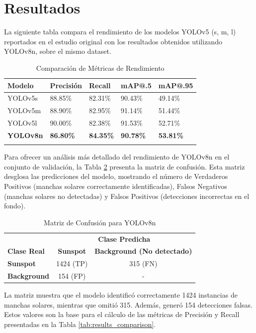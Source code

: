 \documentclass[journal]{IEEEtran}
\begin{document}
\section{Resultados}
La siguiente tabla compara el rendimiento de los modelos YOLOv5 (s, m, l) reportados en el estudio original \cite{Santos2023} con los resultados obtenidos utilizando YOLOv8n, sobre el mismo dataset.
\begin{table}[htbp]
\centering
\caption{Comparación de Métricas de Rendimiento}
\label{tab:results_comparison}
\begin{tabular}{@{}lllll@{}}
\toprule
\textbf{Modelo} & \textbf{Precisión} & \textbf{Recall} & \textbf{mAP@.5} & \textbf{mAP@.95} \\
\midrule
YOLOv5s & 88.85\% & 82.31\% & 90.43\% & 49.14\% \\
YOLOv5m & 88.90\% & 82.95\% & 91.14\% & 51.44\% \\
YOLOv5l & 90.00\% & 82.38\% & 91.53\% & 52.71\% \\
\textbf{YOLOv8n} & \textbf{86.80\%} & \textbf{84.35\%} & \textbf{90.78\%} & \textbf{53.81\%} \\
\bottomrule
\label{tab:comparison_results}
\end{tabular}
\end{table}

Para ofrecer un análisis más detallado del rendimiento de YOLOv8n en el conjunto de validación, la Tabla \ref{tab:confusion_matrix} presenta la matriz de confusión. Esta matriz desglosa las predicciones del modelo, mostrando el número de Verdaderos Positivos (manchas solares correctamente identificadas), Falsos Negativos (manchas solares no detectadas) y Falsos Positivos (detecciones incorrectas en el fondo).
\begin{table}[htbp]
\centering
\caption{Matriz de Confusión para YOLOv8n}
\label{tab:confusion_matrix}
\begin{tabular}{@{}l|cc@{}}
\toprule
\textbf{} & \multicolumn{2}{c}{\textbf{Clase Predicha}} \\
\textbf{Clase Real} & \textbf{Sunspot} & \textbf{Background (No detectado)} \\
\midrule
\textbf{Sunspot} & 1424 (TP) & 315 (FN) \\
\textbf{Background} & 154 (FP) & - \\
\bottomrule
\end{tabular}
\end{table}

La matriz muestra que el modelo identificó correctamente 1424 instancias de manchas solares, mientras que omitió 315. Además, generó 154 detecciones falsas. Estos valores son la base para el cálculo de las métricas de Precisión y Recall presentadas en la Tabla \ref{tab:results_comparison}.
\end{document}
